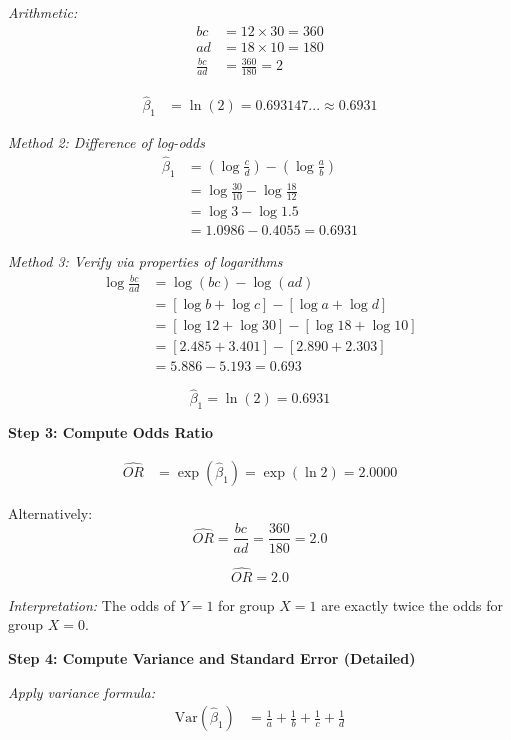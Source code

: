 \documentclass[12pt]{article}
\begin{document}
\begin{solution}
\textit{Arithmetic:}
\begin{align*}
bc &= 12 \times 30 = 360 \\
ad &= 18 \times 10 = 180 \\
\frac{bc}{ad} &= \frac{360}{180} = 2
\end{align*}

\begin{align*}
\hat{\beta}_1 &= \ln(2) = 0.693147... \approx 0.6931
\end{align*}

\textit{Method 2: Difference of log-odds}
\begin{align*}
\hat{\beta}_1 &= \left(\log\frac{c}{d}\right) - \left(\log\frac{a}{b}\right) \\
&= \log\frac{30}{10} - \log\frac{18}{12} \\
&= \log 3 - \log 1.5 \\
&= 1.0986 - 0.4055 = 0.6931
\end{align*}

\textit{Method 3: Verify via properties of logarithms}
\begin{align*}
\log\frac{bc}{ad} &= \log(bc) - \log(ad) \\
&= [\log b + \log c] - [\log a + \log d] \\
&= [\log 12 + \log 30] - [\log 18 + \log 10] \\
&= [2.485 + 3.401] - [2.890 + 2.303] \\
&= 5.886 - 5.193 = 0.693
\end{align*}

\[
\boxed{\hat{\beta}_1 = \ln(2) = 0.6931}
\]

\textbf{Step 3: Compute Odds Ratio}

\begin{align*}
\widehat{OR} &= \exp(\hat{\beta}_1) = \exp(\ln 2) = 2.0000
\end{align*}

Alternatively:
\[
\widehat{OR} = \frac{bc}{ad} = \frac{360}{180} = 2.0
\]

\[
\boxed{\widehat{OR} = 2.0}
\]

\textit{Interpretation:} The odds of $Y=1$ for group $X=1$ are exactly twice the odds for group $X=0$.

\textbf{Step 4: Compute Variance and Standard Error (Detailed)}

\textit{Apply variance formula:}
\begin{align*}
\text{Var}(\hat{\beta}_1) &= \frac{1}{a} + \frac{1}{b} + \frac{1}{c} + \frac{1}{d}
\end{align*}


\end{solution}
\end{document}
